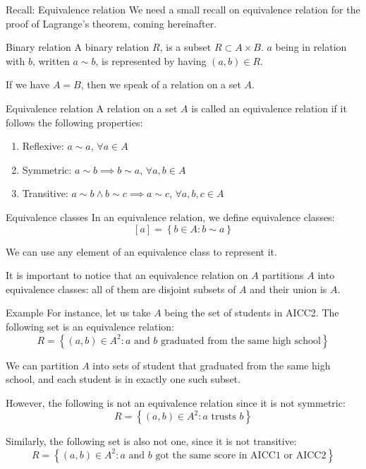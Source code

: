 \documentclass[a4paper]{article}
\begin{document}
\begin{parag}{Recall: Equivalence relation}
    We need a small recall on equivalence relation for the proof of Lagrange's theorem, coming hereinafter.

    \begin{subparag}{Binary relation}
        A binary relation $R$, is a subset $R \subset A \times B$. $a$ being in relation with $b$, written $a \sim b$, is represented by having $\left(a, b\right) \in R$.

        If we have $A = B$, then we speak of a relation on a set $A$.
    \end{subparag}

    \begin{subparag}{Equivalence relation}
        A relation on a set $A$ is called an equivalence relation if it follows the following properties:
        \begin{enumerate}
            \item Reflexive: $a \sim a$, $\forall a \in A$
            \item Symmetric: $a \sim b \implies b \sim a$, $\forall a, b \in A$
            \item Transitive: $a \sim b \land b \sim c \implies a \sim c$, $\forall a, b, c \in A$
        \end{enumerate}
    \end{subparag}

    \begin{subparag}{Equivalence classes}
        In an equivalence relation, we define equivalence classes:
        \[\left[a\right] = \left\{b \in A : b \sim a\right\}\]

        We can use any element of an equivalence class to represent it.

        It is important to notice that an equivalence relation on $A$ partitions $A$ into equivalence classes: all of them are disjoint subsets of $A$ and their union is $A$.
    \end{subparag}


    \begin{subparag}{Example}
        For instance, let us take $A$ being the set of students in AICC2. The following set is an equivalence relation:
        \[R = \left\{\left(a, b\right) \in A^2 : \text{$a$ and $b$ graduated from the same high school}\right\}\]

        We can partition $A$ into sets of student that graduated from the same high school, and each student is in exactly one such subset.

        However, the following is not an equivalence relation since it is not symmetric:
        \[R = \left\{\left(a, b\right) \in A^2 : \text{$a$ trusts $b$}\right\}\]

        Similarly, the following set is also not one, since it is not transitive:
        \[R = \left\{\left(a, b\right) \in A^2 : \text{$a$ and $b$ got the same score in AICC1 or AICC2}\right\}\]
    \end{subparag}
\end{parag}
\end{document}
